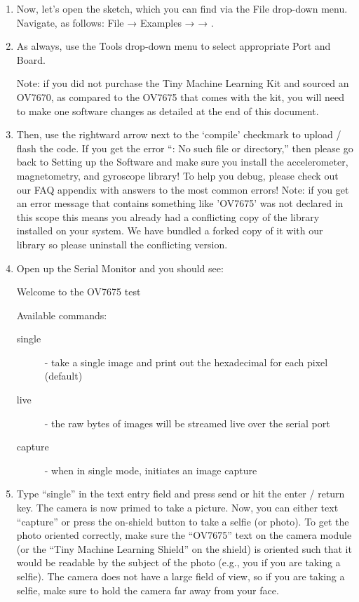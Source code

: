\begin{enumerate}
  \item Now, let’s open the  sketch, which you can find via the File drop-down menu. Navigate, as follows: File → Examples →  → .
    
  \item As always, use the Tools drop-down menu to select appropriate Port and Board.

        Note: if you did not purchase the Tiny Machine Learning Kit and sourced an OV7670, as compared to the OV7675 that comes with the kit, you will need to make one software changes as detailed at the end of this document.

  \item Then, use the rightward arrow next to the ‘compile’ checkmark to upload / flash the code. If you get the error “: No such file or directory,” then please go back to Setting up the Software and make sure you install the accelerometer, magnetometry, and gyroscope library! To help you debug, please check out our FAQ appendix with answers to the most common errors! Note: if you get an error message that contains something like 'OV7675' was not declared in this scope this means you already had a conflicting copy of the  library installed on your system. We have bundled a forked copy of it with our library so please uninstall the conflicting version.

  \item Open up the Serial Monitor and you should see:
  
         Welcome to the OV7675 test

         Available commands:

         \begin{description}
             \item[single] - take a single image and print out the hexadecimal for each pixel (default)
             \item [live] - the raw bytes of images will be streamed live over the serial port
             \item [capture] - when in single mode, initiates an image capture

         \end{description}

  \item Type “single” in the text entry field and press send or hit the enter / return key. The camera is now primed to take a picture. Now, you can either text “capture” or press the on-shield button to take a selfie (or photo). To get the photo oriented correctly, make sure the “OV7675” text on the camera module (or the “Tiny Machine Learning Shield” on the shield) is oriented such that it would be readable by the subject of the photo (e.g., you if you are taking a selfie). The camera does not have a large field of view, so if you are taking a selfie, make sure to hold the camera far away from your face.


\end{enumerate}
